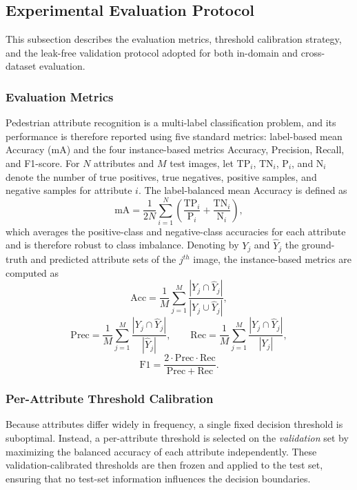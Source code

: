 \documentclass{ieeeaccess}
\begin{document}
\subsection{Experimental Evaluation Protocol}
\label{subsec:eval_protocol}

This subsection describes the evaluation metrics, threshold calibration strategy, and the
leak-free validation protocol adopted for both in-domain and cross-dataset evaluation.

\subsubsection{Evaluation Metrics}
Pedestrian attribute recognition is a multi-label classification problem, and its performance is
therefore reported using five standard metrics: label-based mean Accuracy (mA) and the four
instance-based metrics Accuracy, Precision, Recall, and F1-score. For $N$ attributes and $M$ test
images, let $\mathrm{TP}_i$, $\mathrm{TN}_i$, $\mathrm{P}_i$, and $\mathrm{N}_i$ denote the number of
true positives, true negatives, positive samples, and negative samples for attribute $i$. The
label-balanced mean Accuracy is defined as
\begin{equation}
\mathrm{mA}=\frac{1}{2N}\sum_{i=1}^{N}
\left(\frac{\mathrm{TP}_i}{\mathrm{P}_i}+\frac{\mathrm{TN}_i}{\mathrm{N}_i}\right),
\label{eq:mA}
\end{equation}
which averages the positive-class and negative-class accuracies for each attribute and is therefore
robust to class imbalance. Denoting by $Y_j$ and $\hat{Y}_j$ the ground-truth and predicted attribute
sets of the $j^{th}$ image, the instance-based metrics are computed as
\begin{equation}
\mathrm{Acc}=\frac{1}{M}\sum_{j=1}^{M}
\frac{|Y_j\cap\hat{Y}_j|}{|Y_j\cup\hat{Y}_j|},
\label{eq:acc}
\end{equation}
\begin{equation}
\mathrm{Prec}=\frac{1}{M}\sum_{j=1}^{M}\frac{|Y_j\cap\hat{Y}_j|}{|\hat{Y}_j|},\qquad
\mathrm{Rec}=\frac{1}{M}\sum_{j=1}^{M}\frac{|Y_j\cap\hat{Y}_j|}{|Y_j|},
\label{eq:prec_rec}
\end{equation}
\begin{equation}
\mathrm{F1}=\frac{2\cdot\mathrm{Prec}\cdot\mathrm{Rec}}{\mathrm{Prec}+\mathrm{Rec}}.
\label{eq:f1}
\end{equation}

\subsubsection{Per-Attribute Threshold Calibration}
Because attributes differ widely in frequency, a single fixed decision threshold is suboptimal.
Instead, a per-attribute threshold is selected on the \textit{validation} set by maximizing the
balanced accuracy of each attribute independently. These validation-calibrated thresholds are then
frozen and applied to the test set, ensuring that no test-set information influences the decision
boundaries.
\end{document}

